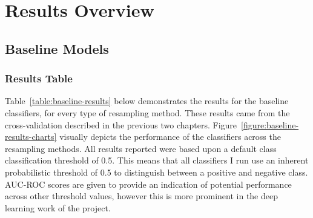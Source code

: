 \documentclass[12pt,a4paper,twoside]{report}
\begin{document}
\section{Results Overview}
\subsection{Baseline Models}
\subsubsection{Results Table}

Table~\ref{table:baseline-results} below demonstrates the results for the baseline classifiers, for every type of resampling method. These results came from the cross-validation described in the previous two chapters. Figure~\ref{figure:baseline-results-charts} visually depicts the performance of the classifiers across the resampling methods. All results reported were based upon a default class classification threshold of 0.5. This means that all classifiers I run use an inherent probabilistic threshold of 0.5 to distinguish between a positive and negative class. AUC-ROC scores are given to provide an indication of potential performance across other threshold values, however this is more prominent in the deep learning work of the project. 
\end{document}
